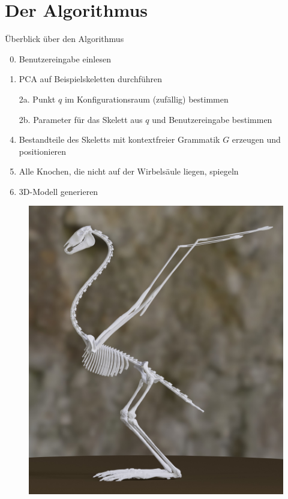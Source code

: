 \documentclass{beamer}
\begin{document}
\section{Der Algorithmus}
\begin{frame}{Überblick über den Algorithmus}
 \begin{enumerate}
  \setcounter{enumi}{-1}
  \item Benutzereingabe einlesen
  \item PCA auf Beispielskeletten durchführen
  \item[2a.] Punkt $q$ im Konfigurationsraum (zufällig) bestimmen 
  \item[2b.] Parameter für das Skelett aus $q$ und Benutzereingabe bestimmen
  \setcounter{enumi}{2}
  \item<2-> Bestandteile des Skeletts mit kontextfreier Grammatik $G$ erzeugen und positionieren
  \item<3-> Alle Knochen, die nicht auf der Wirbelsäule liegen, spiegeln
  \item<4-> 3D-Modell generieren
 \end{enumerate}
\end{frame}

\begin{frame}[focus]
 \begin{figure}
  \centering
  \includegraphics[height=0.9\textheight]{../../java_skeleton_generation/example_skeletons/bird.jpg}
 \end{figure}
\end{frame}
\end{document}
